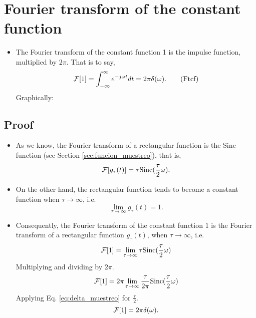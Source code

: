 \section{Fourier transform of the constant function}
\begin{itemize}
\item [] The Fourier transform of the constant function 1 is the
  impulse function, multiplied by $2\pi$. That is to say,
  \begin{equation}
    {\cal{F}}[1] = \int_{-\infty}^\infty e^{-j\omega t}dt = 2\pi\delta(\omega).
    \tag{Ftcf}
    \label{eq:TFfc}
  \end{equation}
  Graphically:
\end{itemize}

\subsection*{Proof}
\begin{itemize}
\item As we know, the Fourier transform of a rectangular function is
  the Sinc function (see Section \ref{sec:funcion_muestreo}), that is,
  \begin{equation*}
    {\cal F}[g_\tau(t)] = \tau\mathrm{Sinc}(\frac{\tau}{2}\omega).
  \end{equation*}
\item On the other hand, the rectangular function tends to become a
  constant function when $\tau\rightarrow\infty$, i.e.
  \begin{equation*}
    \lim_{\tau\rightarrow\infty} g_\tau(t) = 1.
  \end{equation*}
\item Consequently, the Fourier transform of the constant function $1$ is the Fourier transform of a rectangular function $g_\tau(t)$, when $\tau\rightarrow\infty$, i.e.
  \begin{equation*}
    {\cal F}[1] = \displaystyle\lim_{\tau\rightarrow\infty} \tau\mathrm{Sinc}(\frac{\tau}{2}\omega)
  \end{equation*}
  Multiplying and dividing by $2\pi$.
  \begin{equation*}
    {\cal F}[1] = \displaystyle2\pi\lim_{\tau\rightarrow\infty}
    \frac{\tau}{2\pi}\text{Sinc}(\frac{\tau}{2}\omega)
  \end{equation*}
  Applying Eq. \ref{eq:delta_muestreo} for $\frac{\tau}{2}$.
  \begin{equation*}
    {\cal F}[1] =2\pi\delta(\omega).
  \end{equation*}
  
\end{itemize}

